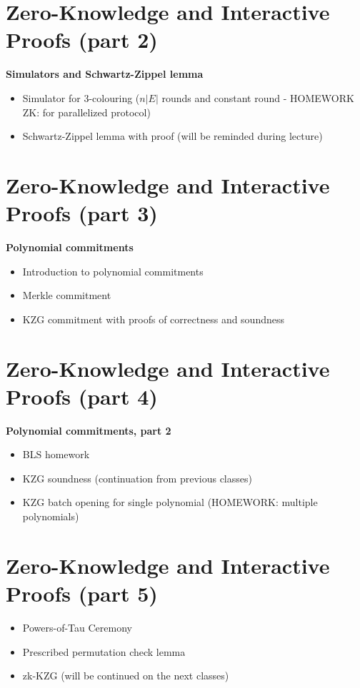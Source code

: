 \documentclass{llncs}
\begin{document}
\section{Zero-Knowledge and Interactive Proofs (part 2)}
\textbf{Simulators and Schwartz-Zippel lemma}
\begin{itemize}
	\item Simulator for 3-colouring ($n|E|$ rounds and constant round - HOMEWORK ZK: for parallelized protocol)
	\item Schwartz-Zippel lemma with proof (will be reminded during lecture)
\end{itemize}

\section{Zero-Knowledge and Interactive Proofs (part 3)}
\textbf{Polynomial commitments}
\begin{itemize}
	\item Introduction to polynomial commitments
	\item Merkle commitment
	\item KZG commitment with proofs of correctness and soundness
\end{itemize}


\section{Zero-Knowledge and Interactive Proofs (part 4)}
\textbf{Polynomial commitments, part 2}
\begin{itemize}
	\item BLS homework
	\item KZG soundness (continuation from previous classes)
	\item KZG batch opening for single polynomial (HOMEWORK: multiple polynomials)
\end{itemize}

\section{Zero-Knowledge and Interactive Proofs (part 5)}
\begin{itemize}
	\item Powers-of-Tau Ceremony
	\item Prescribed permutation check lemma
	\item zk-KZG (will be continued on the next classes)
\end{itemize}
\end{document}
